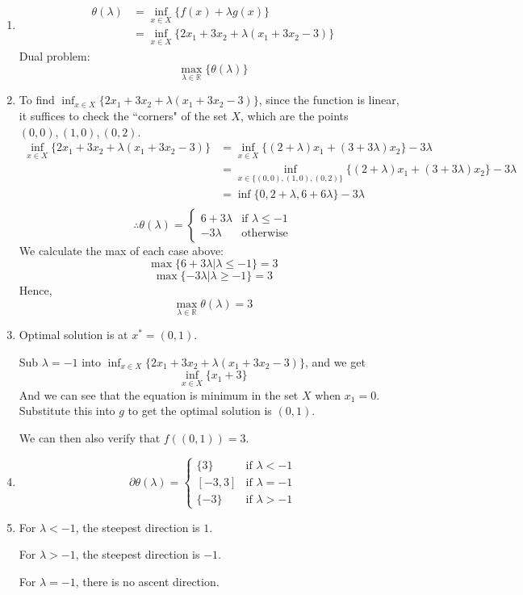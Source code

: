 \documentclass{article}
\newcommand{\R}{\mathbb{R}}
\begin{document}
\begin{enumerate}[label=(\roman*)]
\item
    \begin{align*}
    \theta(\lambda) &= \inf_{x \in X} \{f(x) + \lambda g(x) \} \\
        &= \inf_{x \in X} \{2x_1 +3x_2 + \lambda (x_1 + 3x_2 - 3) \}
    \end{align*}
    Dual problem:
    \[\max_{\lambda \in \R} \{\theta(\lambda)\}\]
\item To find $\inf_{x \in X} \{2x_1 +3x_2 + \lambda (x_1 + 3x_2 - 3) \}$, since the function is linear, it suffices to check the ``corners" of the set $X$, which are the points $(0,0),(1,0),(0,2)$.
    \begin{align*}
    \inf_{x \in X} \{2x_1 +3x_2 + \lambda (x_1 + 3x_2 - 3) \}
        &= \inf_{x \in X} \{(2+\lambda)x_1 +(3+3\lambda)x_2 \} - 3\lambda \\
        &= \inf_{x \in \{(0,0),(1,0),(0,2)\}} \{(2+\lambda)x_1 +(3+3\lambda)x_2 \} - 3\lambda \\
        &= \inf \{0, 2+\lambda, 6+6\lambda \} - 3\lambda \\
    \end{align*}
    \[
    \therefore \theta(\lambda)= \begin{cases}
    6+3\lambda & \text{if $\lambda \leq -1$}\\
    -3\lambda & \text{otherwise}
    \end{cases}
    \]
    We calculate the max of each case above:
    \[\max\{6+3\lambda | \lambda \leq -1\} = 3\]
    \[\max\{-3\lambda | \lambda \geq -1\} = 3\]
    Hence,
    \[\max_{\lambda \in \R} \theta(\lambda) = 3\]
\item Optimal solution is at $x^* = (0,1)$.

    Sub $\lambda = -1$ into $\inf_{x \in X} \{2x_1 +3x_2 + \lambda (x_1 + 3x_2 - 3) \}$, and we get
    \[\inf_{x \in X} \{x_1 + 3\}\]
    And we can see that the equation is minimum in the set $X$ when $x_1=0$. Substitute this into $g$ to get the optimal solution is $(0,1)$.
    
    We can then also verify that $f((0,1))=3$.
\item \[
    \partial \theta(\lambda)= \begin{cases}
    \{3\} & \text{if $\lambda < -1$}\\
    [-3,3] & \text{if $\lambda = -1$}\\
    \{-3\} & \text{if $\lambda > -1$}
    \end{cases}
    \]
\item 
    For $\lambda < -1$, the steepest direction is $1$.
    
    For $\lambda > -1$, the steepest direction is $-1$.
    
    For $\lambda = -1$, there is no ascent direction.
\end{enumerate}
\end{document}
